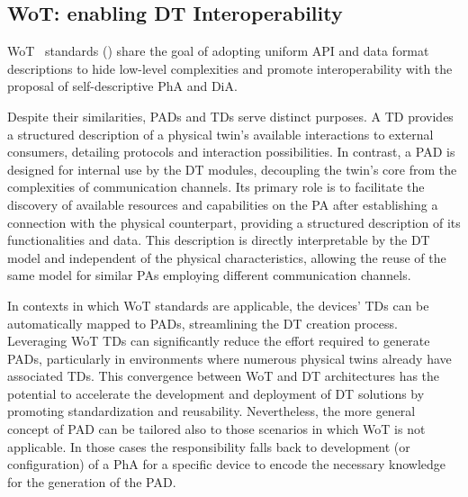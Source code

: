 
\subsection{\acl{WoT}: enabling DT Interoperability}
\label{sec:dte:dt-engineering:wot-for-dt}

\ac{WoT}~\cite{wot-arch} standards () share the goal of adopting uniform API and data format descriptions to hide low-level complexities and promote interoperability with the proposal of self-descriptive \ac{PhA} and \ac{DiA}.

Despite their similarities, \acp{PAD} and \acp{TD} serve distinct purposes. 
A \ac{TD} provides a structured description of a physical twin's available interactions to external consumers, detailing protocols and interaction possibilities.
%
In contrast, a \ac{PAD} is designed for internal use by the \ac{DT} modules, decoupling the twin's core from the complexities of communication channels.
Its primary role is to facilitate the discovery of available resources and capabilities on the \ac{PA} after establishing a connection with the physical counterpart, providing a structured description of its functionalities and data.
This description is directly interpretable by the \ac{DT} model and independent of the physical characteristics, allowing the reuse of the same model for similar \acp{PA} employing different communication channels.

In contexts in which \ac{WoT} standards are applicable, the devices' \acp{TD} can be automatically mapped to \acp{PAD}, streamlining the \ac{DT} creation process.
Leveraging \ac{WoT} \acp{TD} can significantly reduce the effort required to generate \acp{PAD}, particularly in environments where numerous physical twins already have associated \acp{TD}.
This convergence between \ac{WoT} and \ac{DT} architectures has the potential to accelerate the development and deployment of \ac{DT} solutions by promoting standardization and reusability.
%
Nevertheless, the more general concept of \ac{PAD} can be tailored also to those scenarios in which \ac{WoT} is not applicable. In those cases the responsibility falls back to development (or configuration) of a \ac{PhA} for a specific device to encode the necessary knowledge for the generation of the \ac{PAD}.

